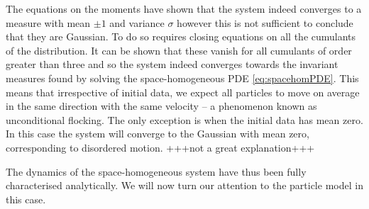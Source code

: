         The equations on the moments have shown that the system indeed converges to a measure with mean $\pm 1$ and variance $\sigma$ however this is not sufficient to conclude that they are Gaussian. To do so requires closing equations on all the cumulants of the distribution. It can be shown that these vanish for all cumulants of order greater than three and so the system indeed converges towards the invariant measures found by solving the space-homogeneous PDE \eqref{eq:spacehomPDE}. This means that irrespective of initial data, we expect all particles to move on average in the same direction with the same velocity -- a phenomenon known as unconditional flocking. The only exception is when the initial data has mean zero. In this case the system will converge to the Gaussian with mean zero, corresponding to disordered motion. +++not a great explanation+++
        
        The dynamics of the space-homogeneous system have thus been fully characterised analytically. We will now turn our attention to the particle model in this case.
